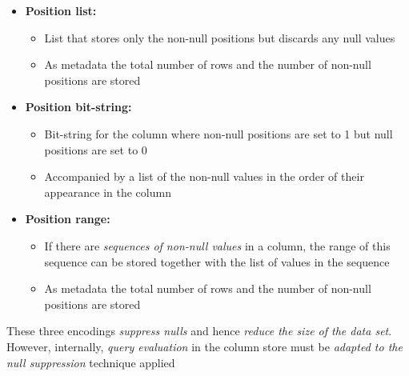 \begin{itemize}
    \item \textbf{Position list:}
    \begin{itemize}
        \item List that stores only the non-null positions but discards any null values
        \item As metadata the total number of rows and the number of non-null positions are stored
    \end{itemize}
    
    
    
    
    \item \textbf{Position bit-string:}
    \begin{itemize}
        \item Bit-string for the column where non-null positions are set to 1 but null positions are set to 0
        \item Accompanied by a list of the non-null values in the order of their appearance in the column
    \end{itemize}


    \item \textbf{Position range:}
    \begin{itemize}
        \item If there are \textit{sequences of non-null values} in a column, the range of this sequence can be stored together with the list of values in the sequence
        \item As metadata the total number of rows and the number of non-null positions are stored
    \end{itemize}
\end{itemize}

\begin{tcolorbox}
These three encodings \textit{suppress nulls} and hence \textit{reduce the size of the data set}. However, internally, \textit{query evaluation} in the column store must be \textit{adapted to the null suppression} technique applied
\end{tcolorbox}

